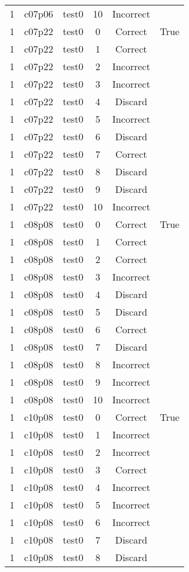\begin{longtable}{|c|c|c|c|c|c|}
1 & c07p06 & test0 & 10 & Incorrect &  \\ 
1 & c07p22 & test0 & 0 & Correct & True \\ 
1 & c07p22 & test0 & 1 & Correct &  \\ 
1 & c07p22 & test0 & 2 & Incorrect &  \\ 
1 & c07p22 & test0 & 3 & Incorrect &  \\ 
1 & c07p22 & test0 & 4 & Discard &  \\ 
1 & c07p22 & test0 & 5 & Incorrect &  \\ 
1 & c07p22 & test0 & 6 & Discard &  \\ 
1 & c07p22 & test0 & 7 & Correct &  \\ 
1 & c07p22 & test0 & 8 & Discard &  \\ 
1 & c07p22 & test0 & 9 & Discard &  \\ 
1 & c07p22 & test0 & 10 & Incorrect &  \\ 
1 & c08p08 & test0 & 0 & Correct & True \\ 
1 & c08p08 & test0 & 1 & Correct &  \\ 
1 & c08p08 & test0 & 2 & Correct &  \\ 
1 & c08p08 & test0 & 3 & Incorrect &  \\ 
1 & c08p08 & test0 & 4 & Discard &  \\ 
1 & c08p08 & test0 & 5 & Discard &  \\ 
1 & c08p08 & test0 & 6 & Correct &  \\ 
1 & c08p08 & test0 & 7 & Discard &  \\ 
1 & c08p08 & test0 & 8 & Incorrect &  \\ 
1 & c08p08 & test0 & 9 & Incorrect &  \\ 
1 & c08p08 & test0 & 10 & Incorrect &  \\ 
1 & c10p08 & test0 & 0 & Correct & True \\ 
1 & c10p08 & test0 & 1 & Incorrect &  \\ 
1 & c10p08 & test0 & 2 & Incorrect &  \\ 
1 & c10p08 & test0 & 3 & Correct &  \\ 
1 & c10p08 & test0 & 4 & Incorrect &  \\ 
1 & c10p08 & test0 & 5 & Incorrect &  \\ 
1 & c10p08 & test0 & 6 & Incorrect &  \\ 
1 & c10p08 & test0 & 7 & Discard &  \\ 
1 & c10p08 & test0 & 8 & Discard &  \\ 

\end{longtable}
